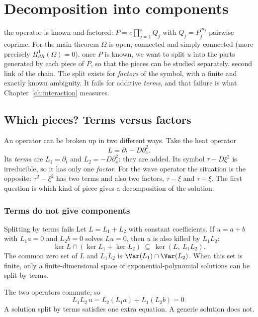 \chapter{Decomposition into components}\label{ch:decomp}
\chapterbrief
{the operator is known and factored: $P=c\prod_{j=1}^sQ_j$ with $Q_j=P_j^{m_j}$ pairwise coprime. For the main theorem $\Omega$ is open, connected and simply connected (more precisely $H^1_{dR}(\Omega)=0$).}
{once $P$ is known, we want to split $u$ into the parts generated by each piece of $P$, so that the pieces can be studied separately.}
{second link of the chain. The split exists for \emph{factors} of the symbol, with a finite and exactly known ambiguity. It fails for additive \emph{terms}, and that failure is what Chapter~\ref{ch:interaction} measures.}

\section{Which pieces? Terms versus factors}

An operator can be broken up in two different ways. Take the heat operator
\[
L=\partial_t-D\partial_x^2 .
\]
Its \emph{terms} are $L_1=\partial_t$ and $L_2=-D\partial_x^2$: they are added. Its symbol $\tau-D\xi^2$ is irreducible, so it has only one \emph{factor}. For the wave operator the situation is the opposite: $\tau^2-\xi^2$ has two terms and also two factors, $\tau-\xi$ and $\tau+\xi$. The first question is which kind of piece gives a decomposition of the solution.

\subsection{Terms do not give components}

\begin{proposition}{Splitting by terms fails  \proved}\label{prop:terms}
Let $L=L_1+L_2$ with constant coefficients. If $u=a+b$ with $L_1a=0$ and $L_2b=0$ solves $Lu=0$, then $u$ is also killed by $L_1L_2$:
\[
\ker L\cap(\ker L_1+\ker L_2)\ \subseteq\ \ker(L,\ L_1L_2).
\]
The common zero set of $L$ and $L_1L_2$ is $\Var(L_1)\cap\Var(L_2)$. When this set is finite, only a finite-dimensional space of exponential-polynomial solutions can be split by terms.

\end{proposition}

\begin{intuition}
The two operators commute, so
\[
L_1L_2\,u=L_2(L_1a)+L_1(L_2b)=0 .
\]
A solution split by terms satisfies one extra equation. A generic solution does not.
\end{intuition}

